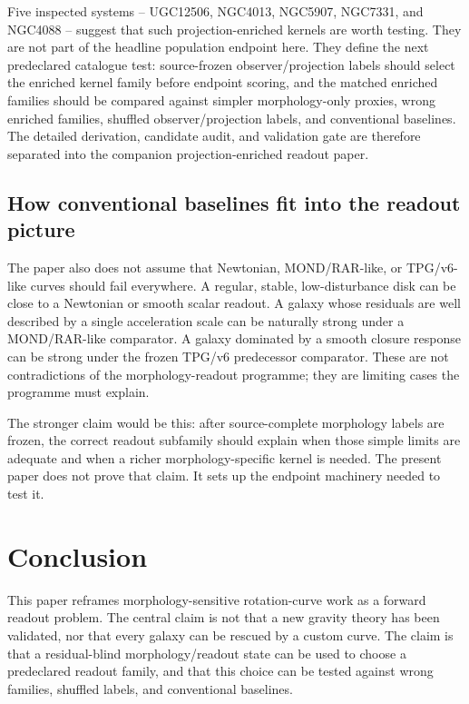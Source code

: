 \documentclass[11pt]{article}
\begin{document}
Five inspected systems -- UGC12506, NGC4013, NGC5907, NGC7331, and NGC4088 -- suggest
that such projection-enriched kernels are worth testing.  They are not part of
the headline population endpoint here.  They define the next predeclared
catalogue test: source-frozen observer/projection labels should select the
enriched kernel family before endpoint scoring, and the matched enriched
families should be compared against simpler morphology-only proxies, wrong
enriched families, shuffled observer/projection labels, and conventional
baselines.  The detailed derivation, candidate audit, and validation gate are
therefore separated into the companion projection-enriched readout paper.

\subsection{How conventional baselines fit into the readout picture}

The paper also does not assume that Newtonian, MOND/RAR-like, or TPG/v6-like
curves should fail everywhere.  A regular, stable, low-disturbance disk can be
close to a Newtonian or smooth scalar readout.  A galaxy whose residuals are
well described by a single acceleration scale can be naturally strong under a
MOND/RAR-like comparator.  A galaxy dominated by a smooth closure response can
be strong under the frozen TPG/v6 predecessor comparator.  These are not
contradictions of the morphology-readout programme; they are limiting cases the
programme must explain.

The stronger claim would be this: after source-complete morphology labels are
frozen, the correct readout subfamily should explain when those simple limits
are adequate and when a richer morphology-specific kernel is needed.  The
present paper does not prove that claim.  It sets up the endpoint machinery
needed to test it.

\section{Conclusion}

This paper reframes morphology-sensitive rotation-curve work as a forward
readout problem.  The central claim is not that a new gravity theory has been
validated, nor that every galaxy can be rescued by a custom curve.  The claim is
that a residual-blind morphology/readout state can be used to choose a
predeclared readout family, and that this choice can be tested against wrong
families, shuffled labels, and conventional baselines.
\end{document}
